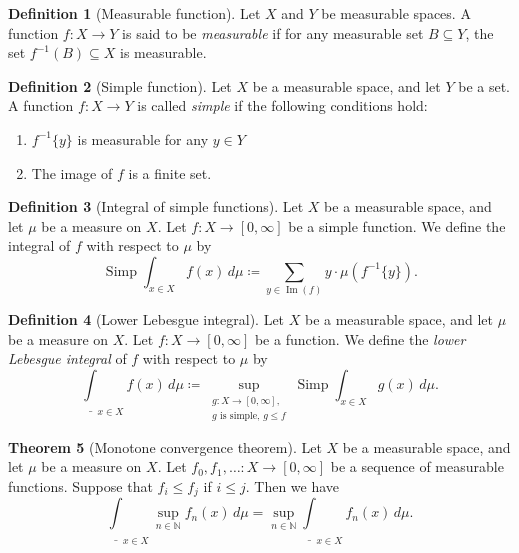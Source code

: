 \documentclass{article}
\theoremstyle{definition}
\newtheorem{theorem}{Theorem}[section]
\newtheorem{definition}[theorem]{Definition}
\DeclareMathOperator{\Img}{Im}
\DeclareMathOperator{\Simp}{Simp}
\begin{document}
\begin{definition}[Measurable function]
  Let $X$ and $Y$ be measurable spaces.
  A function $f : X \to Y$ is said to be \emph{measurable} if
  for any measurable set $B \subseteq Y$,
  the set $f^{-1} (B) \subseteq X$ is measurable.
\end{definition}

\begin{definition}[Simple function]
  Let $X$ be a measurable space,
  and let $Y$ be a set.
  A function $f : X \to Y$ is called \emph{simple} if
  the following conditions hold:
  \begin{enumerate}
    \item $f^{-1} \{y\}$ is measurable for any $y \in Y$
    \item The image of $f$ is a finite set.
  \end{enumerate}
\end{definition}

\begin{definition}[Integral of simple functions]
  Let $X$ be a measurable space,
  and let $\mu$ be a measure on $X$.
  Let $f : X \to [0, \infty]$ be a simple function.
  We define the integral of $f$ with respect to $\mu$ by
  \begin{equation*}
    \Simp \int_{x \in X} f (x) \, d\mu
      \coloneqq \sum_{y \in \Img (f)}
        y \cdot \mu(f^{-1}\{y\}).
  \end{equation*}
\end{definition}

\begin{definition}[Lower Lebesgue integral]
  Let $X$ be a measurable space,
  and let $\mu$ be a measure on $X$.
  Let $f : X \to [0, \infty]$ be a function.
  We define the \emph{lower Lebesgue integral} of $f$ with respect to $\mu$ by
  \begin{equation*}
    \underline{\int}_{x \in X} f (x) \, d\mu 
      \coloneqq \sup_{\substack{g : X \to [0, \infty],\\ \text{$g$ is simple},\, g \leq f}}
        \Simp \int_{x \in X} g (x) \, d\mu.
  \end{equation*}
\end{definition}

\begin{theorem}[Monotone convergence theorem]
  Let $X$ be a measurable space,
  and let $\mu$ be a measure on $X$.
  Let $f_0, f_1, \dots : X \to [0, \infty]$ be
  a sequence of measurable functions.
  Suppose that $f_i \leq f_j$ if $i \leq j$.
  Then we have
  \begin{equation*}
    \underline{\int}_{x \in X} \sup_{n \in \mathbb{N}} f_n (x) \, d\mu
      = \sup_{n \in \mathbb{N}} \underline{\int}_{x \in X} f_n (x) \, d\mu.
  \end{equation*}
\end{theorem}
\end{document}
